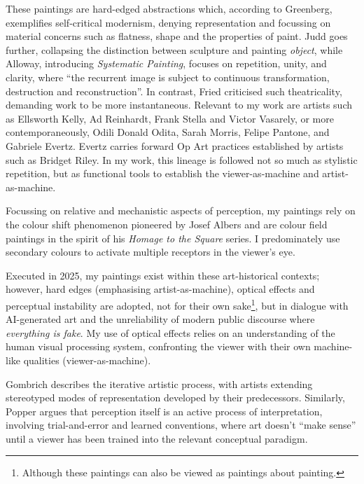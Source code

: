 \documentclass[12pt]{article}
\begin{document}
These paintings are hard-edged abstractions which, according to
Greenberg, exemplifies self-critical modernism, denying representation
and focussing on material concerns such as flatness, shape and the
properties of paint.\cite[p.~85--93]{Greenberg1961} Judd goes further,
collapsing the distinction between sculpture and painting
\emph{object}\cite{Judd1965}, while Alloway, introducing
\emph{Systematic Painting}, focuses on repetition, unity, and clarity,
where ``the recurrent image is subject to continuous transformation,
destruction and reconstruction''.\cite[pp.~18--19]{Alloway1975} In
contrast, Fried criticised such theatricality, demanding work to be
more instantaneous.\cite[pp.~12--23]{Fried1968} Relevant to my work are
artists such as Ellsworth Kelly, Ad Reinhardt, Frank Stella and Victor
Vasarely, or more contemporaneously, Odili Donald Odita, Sarah Morris,
Felipe Pantone, and Gabriele Evertz. Evertz carries forward Op Art
practices\cite{Follin2004EmbodiedVisions,Seitz1965ResponsiveEye}
established by artists such as Bridget
Riley.\cite{Riley2019EyesMind,Riley2019DialoguesOnArt} In my work,
this lineage is followed not so much as stylistic repetition, but as
functional tools to establish the viewer-as-machine and artist-as-machine.

Focussing on relative and mechanistic aspects of perception, my
paintings rely on the colour shift phenomenon pioneered by Josef
Albers\cite{albers} and are colour field paintings in the spirit of
his \emph{Homage to the Square} series. I predominately use secondary
colours to activate multiple receptors in the viewer's
eye.\cite{HurvichJameson1957,Land1977,SchnapfKraftBaylor1987}

Executed in 2025, my paintings exist within these art-historical
contexts; however, hard edges (emphasising artist-as-machine),
optical effects and perceptual instability are adopted, not for their
own sake\footnote{Although these paintings can also be viewed as
  paintings about painting.}, but in dialogue with AI-generated art
and the unreliability of modern public discourse where \emph{everything is
fake}. My use of optical effects relies on an understanding of the human
visual processing system, confronting the viewer with their own
machine-like qualities (viewer-as-machine).

Gombrich describes the iterative artistic process, with artists
extending stereotyped modes of representation developed by their
predecessors.\cite[Chapters II, V]{gombrich1960art} Similarly, Popper
argues that perception itself is an active process of interpretation,
involving trial-and-error and learned conventions, where art doesn't
``make sense'' until a viewer has been trained into the relevant
conceptual paradigm.\cite[Chapter 2]{popper1972objective}
\end{document}
